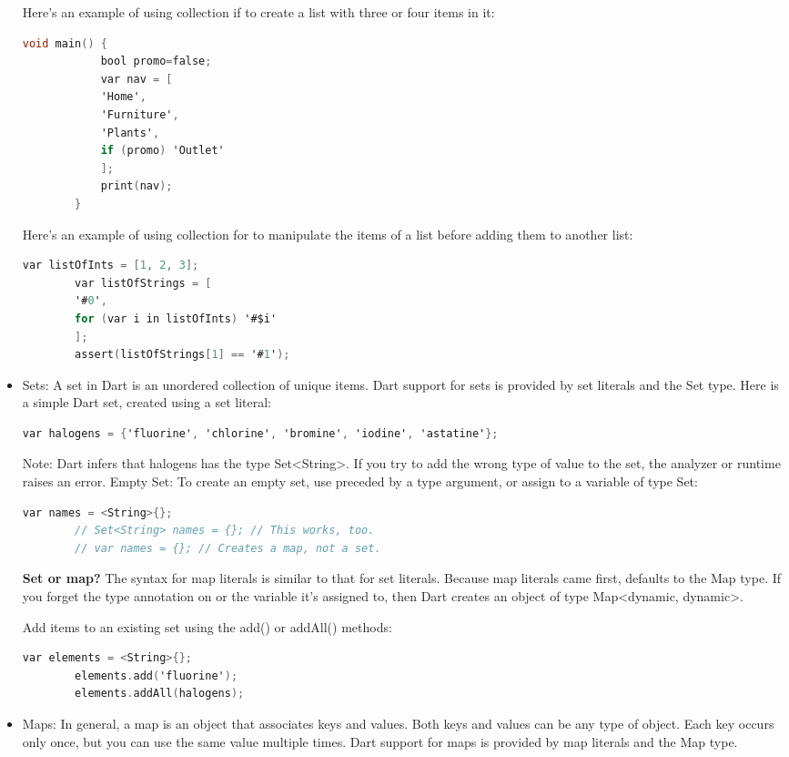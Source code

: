 \begin{itemize}
	Here's an example of using collection if to create a list with three or four items in it:
	\begin{lstlisting}[language=C]
		void main() {
			bool promo=false;
			var nav = [
			'Home',
			'Furniture',
			'Plants',
			if (promo) 'Outlet'
			];
			print(nav);
		}
	\end{lstlisting}
	Here's an example of using collection for to manipulate the items of a list before adding them to another list:
	\begin{lstlisting}[language=C]
		var listOfInts = [1, 2, 3];
		var listOfStrings = [
		'#0',
		for (var i in listOfInts) '#$i'
		];
		assert(listOfStrings[1] == '#1');
	\end{lstlisting}
	\item Sets: A set in Dart is an unordered collection of unique items. Dart support for sets is provided by set literals and the Set type.
	Here is a simple Dart set, created using a set literal:
	\begin{lstlisting}[language=C]
		var halogens = {'fluorine', 'chlorine', 'bromine', 'iodine', 'astatine'};
	\end{lstlisting}
	Note: Dart infers that halogens has the type Set<String>. If you try to add the wrong type of value to the set, the analyzer or runtime raises an error. 
	\subsubitem Empty Set: To create an empty set, use {} preceded by a type argument, or assign {} to a variable of type Set:
	\begin{lstlisting}[language=C]
		var names = <String>{};
		// Set<String> names = {}; // This works, too.
		// var names = {}; // Creates a map, not a set.
	\end{lstlisting}
	\textbf{Set or map?} The syntax for map literals is similar to that for set literals. Because map literals came first, {} defaults to the Map type. If you forget the type annotation on {} or the variable it's assigned to, then Dart creates an object of type Map<dynamic, dynamic>.
	
	\subsubitem Add items to an existing set using the add() or addAll() methods:
	\begin{lstlisting}[language=C]
		var elements = <String>{};
		elements.add('fluorine');
		elements.addAll(halogens);
	\end{lstlisting}
	\item Maps: In general, a map is an object that associates keys and values. Both keys and values can be any type of object. Each key occurs only once, but you can use the same value multiple times. Dart support for maps is provided by map literals and the Map type.
	

\end{itemize}
